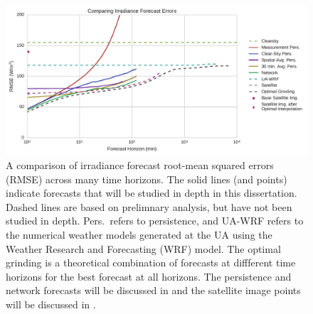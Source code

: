\begin{figure}[h]
\includegraphics[width=\textwidth]{figs/timehorizon.pdf}
\caption[Irradiance forecast errors across forecast horizons]{A
  comparison of irradiance forecast root-mean squared errors (RMSE)
  across many time horizons. The solid lines (and points) indicate
  forecasts that will be studied in depth in this dissertation. Dashed
  lines are based on prelimnary analysis, but have not been studied in
  depth. Pers.\ refers to persistence, and UA-WRF refers to the
  numerical weather models generated at the UA using the Weather
  Research and Forecasting (WRF) model. The optimal grinding is a
  theoretical combination of forecasts at diffferent time horizons for
  the best forecast at all horizons. The persistence and network
  forecasts will be discussed in  and the satellite
  image points will be discussed in .}
\label{fig:bullshitplot}
\end{figure}




